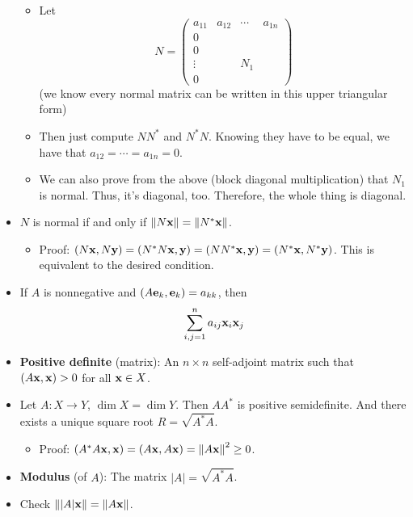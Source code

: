 \documentclass[../../notes.tex]{subfiles}
\begin{document}
\begin{itemize}
\begin{itemize}
        \item Let
        \begin{equation*}
            N =
            \begin{pmatrix}
                a_{11} & a_{12} & \cdots & a_{1n}\\
                0 &  &  & \\
                0 &  &  & \\
                \vdots &  & N_1 & \\
                0 &  &  & \
            \end{pmatrix}
        \end{equation*}
        (we know every normal matrix can be written in this upper triangular form)
        \item Then just compute $NN^*$ and $N^*N$. Knowing they have to be equal, we have that $a_{12}=\cdots=a_{1n}=0$.
        \item We can also prove from the above (block diagonal multiplication) that $N_1$ is normal. Thus, it's diagonal, too. Therefore, the whole thing is diagonal.
    \end{itemize}
    \item $N$ is normal if and only if $\norm{N\mathbf{x}}=\norm{N^*\mathbf{x}}$.
    \begin{itemize}
        \item Proof: $(N\mathbf{x},N\mathbf{y})=(N^*N\mathbf{x},\mathbf{y})=(NN^*\mathbf{x},\mathbf{y})=(N^*\mathbf{x},N^*\mathbf{y})$. This is equivalent to the desired condition.
    \end{itemize}
    \item If $A$ is nonnegative and $(A\mathbf{e}_k,\mathbf{e}_k)=a_{kk}$, then
    \begin{equation*}
        \sum_{i,j=1}^na_{ij}\mathbf{x}_i\mathbf{x}_j
    \end{equation*}
    \item \textbf{Positive definite} (matrix): An $n\times n$ self-adjoint matrix such that $(A\mathbf{x},\mathbf{x})>0$ for all $\mathbf{x}\in X$.
    \item Let $A:X\to Y$, $\dim X=\dim Y$. Then $AA^*$ is positive semidefinite. And there exists a unique square root $R=\sqrt{A^*A}$.
    \begin{itemize}
        \item Proof: $(A^*A\mathbf{x},\mathbf{x})=(A\mathbf{x},A\mathbf{x})=\norm{A\mathbf{x}}^2\geq 0$.
    \end{itemize}
    \item \textbf{Modulus} (of $A$): The matrix $|A|=\sqrt{A^*A}$.
    \item Check $\norm{|A|\mathbf{x}}=\norm{A\mathbf{x}}$.
    \begin{equation*}

\end{equation*}
\end{itemize}
\end{document}
